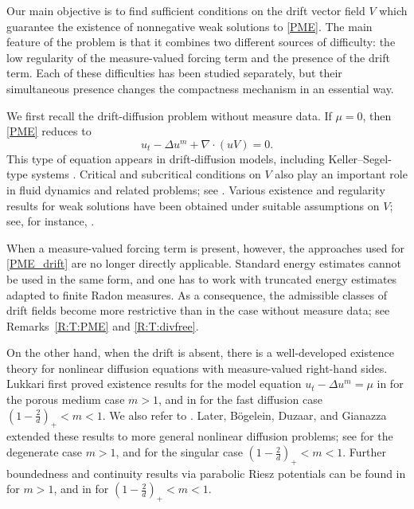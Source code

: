 \documentclass{amsart}
\numberwithin{equation}{section}
\begin{document}
Our main objective is to find sufficient conditions on the drift vector field
\(V\) which guarantee the existence of nonnegative weak solutions to
\eqref{PME}. The main feature of the problem is that it combines two
different sources of difficulty: the low regularity of the measure-valued
forcing term and the presence of the drift term. Each of these difficulties
has been studied separately, but their simultaneous presence changes the
compactness mechanism in an essential way.


We first recall the drift-diffusion problem without measure data. If
\(\mu=0\), then \eqref{PME} reduces to
\begin{equation}\label{PME_drift}
	u_t-\Delta u^m+\nabla\cdot(uV)=0.
\end{equation}
This type of equation appears in drift-diffusion models, including
Keller--Segel-type systems
\cite{BedHe2017,Freitag,KK-SIMA,Win15,CCY2019}. Critical and subcritical
conditions on \(V\) also play an important role in fluid dynamics and related
problems; see \cite{SVZ13,SSSZ,Z11}. Various existence and regularity results
for weak solutions have been obtained under suitable assumptions on \(V\);
see, for instance,
\cites{KZ18,KZ2021,HZ21,HKK01,HKK02,HKK_FDE}. 




When a measure-valued forcing term is present, however, the approaches used
for \eqref{PME_drift} are no longer directly applicable. Standard energy
estimates cannot be used in the same form, and one has to work with
truncated energy estimates adapted to finite Radon measures. As a
consequence, the admissible classes of drift fields become more restrictive
than in the case without measure data; see Remarks~\ref{R:T:PME} and
\ref{R:T:divfree}.




On the other hand, when the drift is absent, there is a well-developed
existence theory for nonlinear diffusion equations with measure-valued
right-hand sides. Lukkari first proved existence results for the model
equation
\(
u_t-\Delta u^m=\mu
\)
in \cite{Luk10} for the porous medium case \(m>1\), and in \cite{Luk12} for
the fast diffusion case
\(
\left(1-\frac{2}{d}\right)_+<m<1.
\)
We also refer to \cite{KLLP19}. Later, B\"ogelein, Duzaar, and Gianazza
extended these results to more general nonlinear diffusion problems; see
\cite{BDG13} for the degenerate case \(m>1\), and \cite{BDG15} for the
singular case
\(
\left(1-\frac{2}{d}\right)_+<m<1.
\)
Further boundedness and continuity results via parabolic Riesz potentials
can be found in \cite{BDG13,BDG14,LS13,Stu15} for \(m>1\), and in
\cite{BDG15,BDG16} for
\(
\left(1-\frac{2}{d}\right)_+<m<1.
\)
\end{document}
